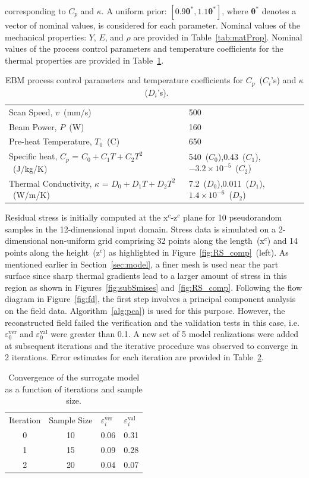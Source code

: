 corresponding to $C_p$ and $\kappa$. A uniform prior: $[0.9\bm{\theta}^\ast, 1.1\bm{\theta}^\ast]$, 
where $\bm{\theta}^\ast$ denotes a vector of nominal values,
is considered for each parameter. Nominal values of the mechanical properties: $Y$, $E$, and $\rho$ are provided
in Table~\ref{tab:matProp}. Nominal values of the process control parameters and temperature coefficients for
the thermal properties are provided in Table~\ref{tab:remain}.
%
\begin{table}[htbp]
\centering
\caption{EBM process control parameters and temperature coefficients for $C_p$~($C_i$'s) and $\kappa$~($D_i$'s).}
\label{tab:remain}
\vspace{1mm}
\begin{tabular}{ ll }
\toprule
Scan Speed, $v$~(mm/s) & 500 \\
Beam Power, $P$~(W) & 160 \\
Pre-heat Temperature, $T_0$~(C) & 650 \\
Specific heat, $C_p$ = $C_0+C_1T+C_2T^2$~(J/kg/K) & 540~($C_0$),0.43~($C_1$),$-3.2\times 10^{-5}$~($C_2$) \\
Thermal Conductivity, $\kappa$ = $D_0+D_1T+D_2T^2$~(W/m/K) & 7.2~($D_0$),0.011~($D_1$),$1.4\times 10^{-6}$~($D_2$) \\
\bottomrule
\end{tabular}
\end{table}

Residual stress is initially computed at the x$^c$-z$^c$ plane for 10 pseudorandom samples in the 12-dimensional
input domain. Stress data is simulated on a 2-dimensional non-uniform grid comprising 32 points along the
length~(x$^c$) and 14 points along the height~(z$^c$) as highlighted in Figure~\ref{fig:RS_comp}~(left).
As mentioned earlier in Section~\ref{sec:model}, a 
finer mesh is used near the part surface since sharp thermal gradients lead to a larger amount of stress
in this region as shown in Figures~\ref{fig:subSmises} and~\ref{fig:RS_comp}.  Following the flow diagram
in Figure~\ref{fig:fd}, the first step involves a principal component analysis on the field data. 
Algorithm~\ref{alg:pca}) is used for this purpose. However, the reconstructed field failed
the verification and the validation tests in this case, i.e. $\varepsilon_0^{\text{ver}}$ and $\varepsilon_0^{\text{val}}$
were greater than 0.1. A new set of 5 model realizations were added at subsequent iterations and the iterative
procedure was observed to converge in 2 iterations. Error estimates for each iteration are provided in
Table~\ref{tab:error}.
%
\begin{table}[htbp]
\centering
\caption{Convergence of the surrogate model as a function of iterations and sample size.}
\label{tab:error}
\vspace{1mm}
\begin{tabular}{ ccll}
\toprule
Iteration &  Sample Size & $\varepsilon_i^{\text{ver}}$ & $\varepsilon_i^{\text{val}}$\\
0 & 10 & 0.06 & 0.31 \\
1 & 15 & 0.09 & 0.28 \\
2 & 20 & 0.04 & 0.07\\
\bottomrule
\end{tabular}
\end{table}


